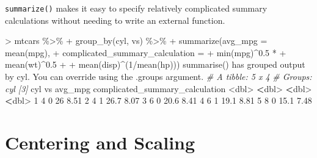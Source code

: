 \documentclass[
]{book}
\newenvironment{Shaded}{\begin{snugshade}}{\end{snugshade}}
\newcommand{\AttributeTok}[1]{\textcolor[rgb]{0.77,0.63,0.00}{#1}}
\newcommand{\CommentTok}[1]{\textcolor[rgb]{0.56,0.35,0.01}{\textit{#1}}}
\newcommand{\DecValTok}[1]{\textcolor[rgb]{0.00,0.00,0.81}{#1}}
\newcommand{\ErrorTok}[1]{\textcolor[rgb]{0.64,0.00,0.00}{\textbf{#1}}}
\newcommand{\FloatTok}[1]{\textcolor[rgb]{0.00,0.00,0.81}{#1}}
\newcommand{\FunctionTok}[1]{\textcolor[rgb]{0.00,0.00,0.00}{#1}}
\newcommand{\NormalTok}[1]{#1}
\newcommand{\SpecialCharTok}[1]{\textcolor[rgb]{0.00,0.00,0.00}{#1}}
\newcommand{\StringTok}[1]{\textcolor[rgb]{0.31,0.60,0.02}{#1}}
\begin{document}
\texttt{summarize()} makes it easy to specify relatively complicated summary calculations without needing to write an external function.

\begin{Shaded}
\begin{Highlighting}[]
\SpecialCharTok{\textgreater{}}\NormalTok{ mtcars }\SpecialCharTok{\%\textgreater{}\%} 
\SpecialCharTok{+}   \FunctionTok{group\_by}\NormalTok{(cyl, vs) }\SpecialCharTok{\%\textgreater{}\%} 
\SpecialCharTok{+}   \FunctionTok{summarize}\NormalTok{(}\AttributeTok{avg\_mpg =} \FunctionTok{mean}\NormalTok{(mpg),}
\SpecialCharTok{+}             \AttributeTok{complicated\_summary\_calculation =} 
\SpecialCharTok{+}               \FunctionTok{min}\NormalTok{(mpg)}\SpecialCharTok{\^{}}\FloatTok{0.5} \SpecialCharTok{*} 
\SpecialCharTok{+}               \FunctionTok{mean}\NormalTok{(wt)}\SpecialCharTok{\^{}}\FloatTok{0.5} \SpecialCharTok{+} 
\SpecialCharTok{+}               \FunctionTok{mean}\NormalTok{(disp)}\SpecialCharTok{\^{}}\NormalTok{(}\DecValTok{1}\SpecialCharTok{/}\FunctionTok{mean}\NormalTok{(hp)))}
\StringTok{\textasciigrave{}}\AttributeTok{summarise()}\StringTok{\textasciigrave{}}\NormalTok{ has grouped output by }\StringTok{\textquotesingle{}cyl\textquotesingle{}}\NormalTok{. You can override using the }\StringTok{\textasciigrave{}}\AttributeTok{.groups}\StringTok{\textasciigrave{}}
\NormalTok{argument.}
\CommentTok{\# A tibble: 5 x 4}
\CommentTok{\# Groups:   cyl [3]}
\NormalTok{    cyl    vs avg\_mpg complicated\_summary\_calculation}
  \SpecialCharTok{\textless{}}\NormalTok{dbl}\SpecialCharTok{\textgreater{}} \ErrorTok{\textless{}}\NormalTok{dbl}\SpecialCharTok{\textgreater{}}   \ErrorTok{\textless{}}\NormalTok{dbl}\SpecialCharTok{\textgreater{}}                           \ErrorTok{\textless{}}\NormalTok{dbl}\SpecialCharTok{\textgreater{}}
\DecValTok{1}     \DecValTok{4}     \DecValTok{0}    \DecValTok{26}                              \FloatTok{8.51}
\DecValTok{2}     \DecValTok{4}     \DecValTok{1}    \FloatTok{26.7}                            \FloatTok{8.07}
\DecValTok{3}     \DecValTok{6}     \DecValTok{0}    \FloatTok{20.6}                            \FloatTok{8.41}
\DecValTok{4}     \DecValTok{6}     \DecValTok{1}    \FloatTok{19.1}                            \FloatTok{8.81}
\DecValTok{5}     \DecValTok{8}     \DecValTok{0}    \FloatTok{15.1}                            \FloatTok{7.48}
\end{Highlighting}
\end{Shaded}

\hypertarget{centering-and-scaling}{%
\section{Centering and Scaling}\label{centering-and-scaling}}
\end{document}
